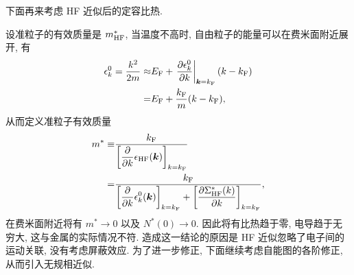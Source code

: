 下面再来考虑 HF 近似后的定容比热.

设准粒子的有效质量是 $m_{\mathrm{HF}}^*$, 当温度不高时, 自由粒子的能量可以在费米面附近展开, 有 
  \begin{align}
        \epsilon_k^0=\frac{k^2}{2m}\approx& E_{\mathrm{F}}+\left.\frac{\partial \epsilon_k^0}{\partial k}\right|_{\boldsymbol{k}=k_{\mathrm{F}}}(k-k_{\mathrm{F}})\nonumber\\
        =&E_{\mathrm{F}}+\frac{k_{\mathrm{F}}}{m}(k-k_{\mathrm{F}}),
    \end{align}
从而定义准粒子有效质量 
 \begin{align}
        m^*\equiv& \frac{k_{\mathrm{F}}}{\left[\displaystyle \frac{\partial}{\partial k}\epsilon_{\mathrm{HF}}(\boldsymbol{k}) \right]_{k=k_{\mathrm{F}}}}\nonumber\\
        =&\frac{k_{\mathrm{F}}}{\left[\displaystyle \frac{\partial}{\partial k}\epsilon_{k}^0(\boldsymbol{k}) \right]_{k=k_{\mathrm{F}}} +\left[\displaystyle \frac{\partial \Sigma_{\mathrm{HF}}^*(k)}{\partial k} \right]_{k=k_{\mathrm{F}}} },    
    \end{align}
在费米面附近将有 $m^*\to 0$ 以及 $N^*(0)\to 0$. 因此将有比热趋于零, 电导趋于无穷大, 这与金属的实际情况不符. 造成这一结论的原因是 HF 近似忽略了电子间的运动关联, 没有考虑屏蔽效应. 
为了进一步修正, 下面继续考虑自能图的各阶修正, 从而引入无规相近似. 

